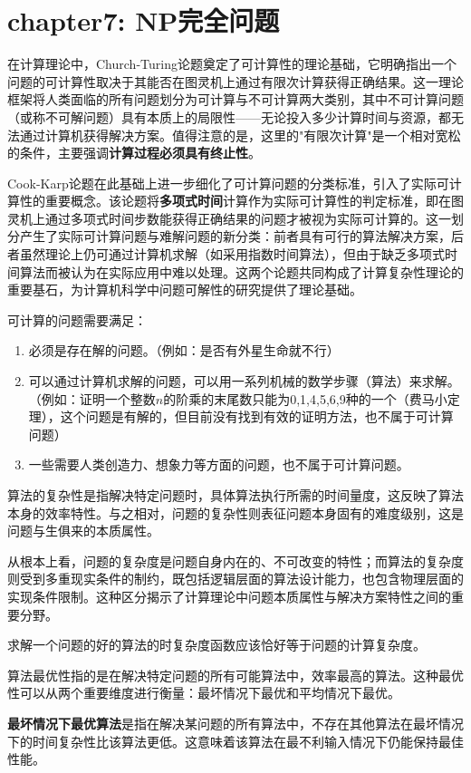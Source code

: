\documentclass[./../main.tex]{subfiles}
\begin{document}
\section{chapter7: NP完全问题}
在计算理论中，Church-Turing论题奠定了可计算性的理论基础，它明确指出一个问题的可计算性取决于其能否在图灵机上通过有限次计算获得正确结果。这一理论框架将人类面临的所有问题划分为可计算与不可计算两大类别，其中不可计算问题（或称不可解问题）具有本质上的局限性——无论投入多少计算时间与资源，都无法通过计算机获得解决方案。值得注意的是，这里的"有限次计算"是一个相对宽松的条件，主要强调\textbf{计算过程必须具有终止性}。

Cook-Karp论题在此基础上进一步细化了可计算问题的分类标准，引入了实际可计算性的重要概念。该论题将\textbf{多项式时间}计算作为实际可计算性的判定标准，即在图灵机上通过多项式时间步数能获得正确结果的问题才被视为实际可计算的。这一划分产生了实际可计算问题与难解问题的新分类：前者具有可行的算法解决方案，后者虽然理论上仍可通过计算机求解（如采用指数时间算法），但由于缺乏多项式时间算法而被认为在实际应用中难以处理。这两个论题共同构成了计算复杂性理论的重要基石，为计算机科学中问题可解性的研究提供了理论基础。

可计算的问题需要满足：
\begin{enumerate}
    \item 必须是存在解的问题。（例如：是否有外星生命就不行）
    \item 可以通过计算机求解的问题，可以用一系列机械的数学步骤（算法）来求解。（例如：证明一个整数$n$的阶乘的末尾数只能为0,1,4,5,6,9种的一个（费马小定理），这个问题是有解的，但目前没有找到有效的证明方法，也不属于可计算问题）
    \item 一些需要人类创造力、想象力等方面的问题，也不属于可计算问题。
\end{enumerate}

算法的复杂性是指解决特定问题时，具体算法执行所需的时间量度，这反映了算法本身的效率特性。与之相对，问题的复杂性则表征问题本身固有的难度级别，这是问题与生俱来的本质属性。

从根本上看，问题的复杂度是问题自身内在的、不可改变的特性；而算法的复杂度则受到多重现实条件的制约，既包括逻辑层面的算法设计能力，也包含物理层面的实现条件限制。这种区分揭示了计算理论中问题本质属性与解决方案特性之间的重要分野。

求解⼀个问题的好的算法的时复杂度函数应该恰好等于问题的计算复杂度。

算法最优性指的是在解决特定问题的所有可能算法中，效率最高的算法。这种最优性可以从两个重要维度进行衡量：最坏情况下最优和平均情况下最优。

\textbf{最坏情况下最优算法}是指在解决某问题的所有算法中，不存在其他算法在最坏情况下的时间复杂性比该算法更低。这意味着该算法在最不利输入情况下仍能保持最佳性能。
\end{document}

